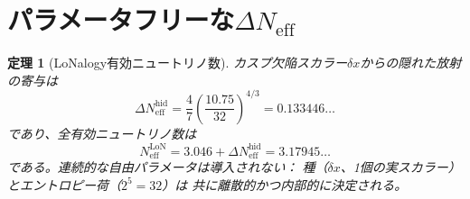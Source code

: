 \documentclass[12pt]{article}
\theoremstyle{plain}
\newtheorem{theorem}{定理}[section]
\theoremstyle{definition}
\numberwithin{equation}{section}
\newcommand{\eff}{\mathrm{eff}}
\newcommand{\LoN}{\mathrm{LoN}}
\newcommand{\hid}{\mathrm{hid}}
\begin{document}
\section{パラメータフリーな$\Delta N_{\eff}$}\label{sec:Neff}

\begin{theorem}[LoNalogy有効ニュートリノ数]\label{thm:Neff}
カスプ欠陥スカラー$\delta x$からの隠れた放射の寄与は
\begin{equation}\label{eq:dNeff}
\boxed{\Delta N_{\eff}^{\hid} = \frac{4}{7}\left(\frac{10.75}{32}\right)^{4/3}
= 0.133446\ldots}
\end{equation}
であり、全有効ニュートリノ数は
\begin{equation}\label{eq:Neff}
\boxed{N_{\eff}^{\LoN} = 3.046 + \Delta N_{\eff}^{\hid} = 3.17945\ldots}
\end{equation}
である。連続的な自由パラメータは導入されない：
種（$\delta x$、1個の実スカラー）とエントロピー荷（$2^5=32$）は
共に離散的かつ内部的に決定される。
\end{theorem}
\end{document}
